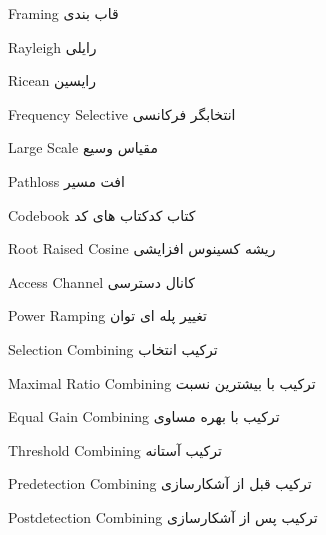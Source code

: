 {Framing}
{قاب بندی}{}



{Rayleigh}
{رایلی}{}


{Ricean}
{رایسین}{}


{Frequency Selective}
{انتخابگر فرکانسی}{}


{Large Scale}
{مقیاس وسیع}{}


%






{Pathloss}
{افت مسیر}{}

%
%
%
%
%


{Codebook}
{کتاب کد}{کتاب های کد}



%
%
%
%




{Root Raised Cosine} 
{ریشه کسینوس افزایشی}{}





{Access Channel}
{کانال دسترسی}{}


{Power Ramping}
{تغییر پله ای توان}{}

{Selection Combining}
{ترکیب انتخاب}{}


{Maximal Ratio Combining}
{ترکیب با بیشترین نسبت}{}

{Equal Gain Combining}
{ترکیب با بهره مساوی}{}

{Threshold Combining}
{ترکیب آستانه}{}

{Predetection Combining}
{ترکیب قبل از آشکارسازی}{}

{Postdetection Combining}
{ترکیب پس از آشکارسازی}{}


